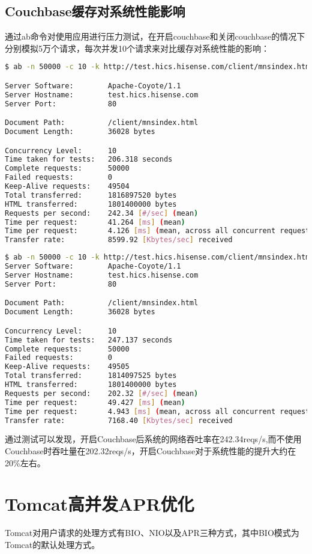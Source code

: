 \subsection{Couchbase缓存对系统性能影响}
通过ab命令对使用应用进行压力测试，在开启couchbase和关闭couchbase的情况下分别模拟5万个请求，每次并发10个请求来对比缓存对系统性能的影响：
\begin{lstlisting}[language=bash,numbers=none]
$ ab -n 50000 -c 10 -k http://test.hics.hisense.com/client/mnsindex.html

Server Software:        Apache-Coyote/1.1
Server Hostname:        test.hics.hisense.com
Server Port:            80

Document Path:          /client/mnsindex.html
Document Length:        36028 bytes

Concurrency Level:      10
Time taken for tests:   206.318 seconds
Complete requests:      50000
Failed requests:        0
Keep-Alive requests:    49504
Total transferred:      1816897520 bytes
HTML transferred:       1801400000 bytes
Requests per second:    242.34 [#/sec] (mean)
Time per request:       41.264 [ms] (mean)
Time per request:       4.126 [ms] (mean, across all concurrent requests)
Transfer rate:          8599.92 [Kbytes/sec] received
\end{lstlisting}
\begin{lstlisting}[language=bash,numbers=none]
$ ab -n 50000 -c 10 -k http://test.hics.hisense.com/client/mnsindex.html
Server Software:        Apache-Coyote/1.1
Server Hostname:        test.hics.hisense.com
Server Port:            80

Document Path:          /client/mnsindex.html
Document Length:        36028 bytes

Concurrency Level:      10
Time taken for tests:   247.137 seconds
Complete requests:      50000
Failed requests:        0
Keep-Alive requests:    49505
Total transferred:      1814097525 bytes
HTML transferred:       1801400000 bytes
Requests per second:    202.32 [#/sec] (mean)
Time per request:       49.427 [ms] (mean)
Time per request:       4.943 [ms] (mean, across all concurrent requests)
Transfer rate:          7168.40 [Kbytes/sec] received
\end{lstlisting}
通过测试可以发现，开启Couchbase后系统的网络吞吐率在242.34reqs/s,而不使用Couchbase时吞吐量在202.32reqs/s，开启Couchbase对于系统性能的提升大约在20\%左右。
\section{Tomcat高并发APR优化}
Tomcat对用户请求的处理方式有BIO、NIO以及APR三种方式，其中BIO模式为Tomcat的默认处理方式\cite{vukotic2011securing}。

